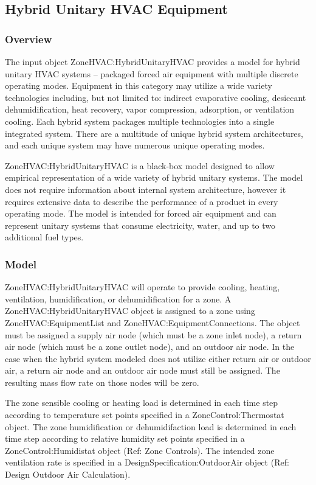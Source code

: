 \subsection{Hybrid Unitary HVAC Equipment}

\subsubsection{Overview}
The input object ZoneHVAC:HybridUnitaryHVAC provides a model for hybrid unitary HVAC systems – packaged forced air equipment with multiple discrete operating modes. Equipment in this category may utilize a wide variety technologies including, but not limited to: indirect evaporative cooling, desiccant dehumidification, heat recovery, vapor compression, adsorption, or ventilation cooling. Each hybrid system packages multiple technologies into a single integrated system. There are a multitude of unique hybrid system architectures, and each unique system may have numerous unique operating modes.

ZoneHVAC:HybridUnitaryHVAC is a black-box model designed to allow empirical representation of a wide variety of hybrid unitary systems. The model does not require information about internal system architecture, however it requires extensive data to describe the performance of a product in every operating mode. The model is intended for forced air equipment and can represent unitary systems that consume electricity, water, and up to two additional fuel types.

\subsubsection{Model}
ZoneHVAC:HybridUnitaryHVAC will operate to provide cooling, heating, ventilation, humidification, or dehumidification for a zone. A ZoneHVAC:HybridUnitaryHVAC object is assigned to a zone using ZoneHVAC:EquipmentList and ZoneHVAC:EquipmentConnections. The object must be assigned a supply air node (which must be a zone inlet node), a return air node (which must be a zone outlet node), and an outdoor air node. In the case when the hybrid system modeled does not utilize either return air or outdoor air, a return air node and an outdoor air node must still be assigned. The resulting mass flow rate on those nodes will be zero.

The zone sensible cooling or heating load is determined in each time step according to temperature set points specified in a ZoneControl:Thermostat object. The zone humidification or dehumidifaction load is determined in each time step according to relative humidity set points specified in a ZoneControl:Humidistat object (Ref: Zone Controls). The intended zone ventilation rate is specified in a DesignSpecification:OutdoorAir object (Ref: Design Outdoor Air Calculation).

